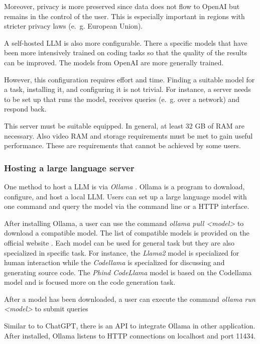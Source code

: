 Moreover, privacy is more preserved since data does not flow to OpenAI but remains in the control of the user. This is especially important in regions with stricter privacy laws (e.~g. European Union).

A self-hosted \ac{LLM} is also more configurable. There a specific models that have been more intensively trained on coding tasks so that the quality of the results can be improved. The models from OpenAI are more generally trained. 

However, this configuration requires effort and time. Finding a suitable model for a task, installing it, and configuring it is not trivial. For instance, a server needs to be set up that  runs the model, receives queries (e.~g. over a network) and respond back. 

This server must be suitable equipped. In general, at least 32 GB of RAM are necessary. Also video RAM and storage requirements must be met to gain useful performance. These are requirements that cannot be achieved by some users. 

\subsubsection{Hosting a large language server}

One method to host a \ac{LLM} is via \textit{Ollama} \cite{ollama}. Ollama is a program to download, configure, and host a local \ac{LLM}. Users can set up a large language model with one command and query the model via the command line or a \ac{HTTP} interface.

After installing Ollama, a user can use the command \textit{ollama pull <model>} to download a compatible model. The list of compatible models is provided on the official website \cite{ollama}. Each model can be used for general task but they are also specialized in specific task. For instance, the \textit{Llama2} model is specialized for human interaction while the \textit{Codellama} is specialized for discussing and generating source code. The \textit{Phind CodeLlama} model is based on the Codellama model and is focused more on the code generation task. 

After a model has been downloaded, a user can execute the command \textit{ollama run <model>} to submit queries 

Similar to to ChatGPT, there is an \ac{API} to integrate Ollama in other application. After installed, Ollama listens to \ac{HTTP} connections  on localhost and port 11434.

